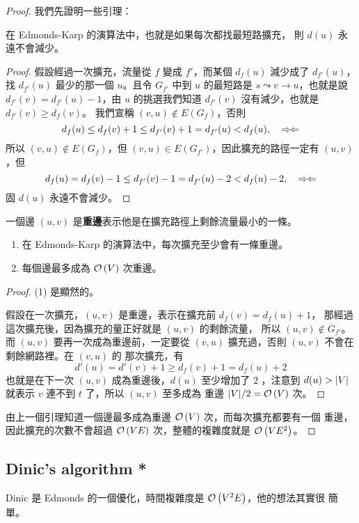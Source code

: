 \documentclass[a4paper,12pt]{book}
\begin{document}
\begin{proof}
我們先證明一些引理：
\begin{lemma}
  在 Edmonds-Karp 的演算法中，也就是如果每次都找最短路擴充，
  則 $d(u)$ 永遠不會減少。
\end{lemma}
\begin{proof}
  假設經過一次擴充，流量從 $f$ 變成 $f'$，而某個 $d_f(u)$ 減少成了 $d_{f'}(u)$，
  找 $d_{f'}(u)$ 最少的那一個 $u$。且令 $G_{f'}$ 中到 $u$ 的最短路是
  $s \leadsto v \rightarrow u$，也就是說 $d_{f'}(v) = d_{f'}(u) - 1$，由 $u$
  的挑選我們知道 $d_{f'}(v)$ 沒有減少，也就是 $d_{f'}(v) \geq d_f(v)$。
  我們宣稱 $(v, u) \notin E(G_f)$，否則
  \[ d_f(u) \leq d_f(v) + 1 \leq d_{f'}(v) + 1 = d_{f'}(u) < d_f(u), \quad \Rightarrow\hspace*{-1pt}\Leftarrow\]
  所以 $(v, u) \notin E(G_f)$，但 $(v, u) \in E(G_{f'})$，因此擴充的路徑一定有 $(u, v)$
  ，但
  \[ d_f(u) = d_f(v) - 1 \leq d_{f'}(v) - 1 = d_{f'}(u) - 2 < d_f(u) - 2, \quad \Rightarrow\hspace*{-1pt}\Leftarrow\]
    固 $d(u)$ 永遠不會減少。
\end{proof}
\clearpage
\begin{definition}
  一個邊 $(u, v)$ 是{\bf 重邊}表示他是在擴充路徑上剩餘流量最小的一條。
\end{definition}
\begin{lemma}
  \pass
  \begin{enumerate}
    \item 在 Edmonds-Karp 的演算法中，每次擴充至少會有一條重邊。
    \item 每個邊最多成為 $\operatorname{\mathcal{O}}\left(V\right)$ 次重邊。
  \end{enumerate}
\end{lemma}
\begin{proof} (1) 是顯然的。
  
  假設在一次擴充，$(u, v)$ 是重邊，表示在擴充前 $d_f(v) = d_f(u) + 1$，
  那經過這次擴充後，因為擴充的量正好就是 $(u, v)$ 的剩餘流量，
  所以 $(u, v) \notin G_{f'}$。而 $(u, v)$ 要再一次成為重邊前，一定要從
  $(v, u)$ 擴充過，否則 $(u, v)$ 不會在剩餘網路裡。在 $(v, u)$ 的
  那次擴充，有
  \[ d'(u) = d'(v) + 1 \geq d_f(v) + 1 = d_f(u) + 2 \]
  也就是在下一次 $(u, v)$ 成為重邊後，$d(u)$ 至少增加了 $2$ ，注意到
  $d(u) > \lvert V \rvert$ 就表示 $v$ 連不到 $t$ 了，所以 $(u, v)$ 至多成為
  重邊 $\lvert V \rvert / 2 = \operatorname{\mathcal{O}}\left(V\right)$ 次。
\end{proof}
由上一個引理知道一個邊最多成為重邊 $\operatorname{\mathcal{O}}\left(V\right)$ 次，而每次擴充都要有一個
重邊，因此擴充的次數不會超過 $\operatorname{\mathcal{O}}\left(VE\right)$ 次，整體的複雜度就是 $\operatorname{\mathcal{O}}\left(VE^2\right)$。
\end{proof}

\subsection{Dinic's algorithm *}
Dinic 是 Edmonds 的一個優化，時間複雜度是 $\operatorname{\mathcal{O}}\left(V^2 E\right)$，他的想法其實很
簡單。
\end{document}
